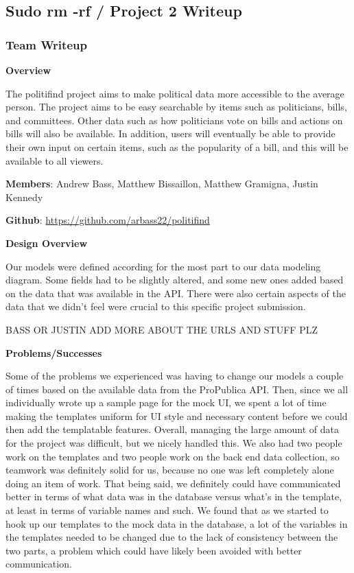 \documentclass{article}
\newcommand{\n}{\noindent}
\begin{document}
\begin{center}
\subsection*{Sudo rm -rf / Project 2 Writeup}
\end{center}

\subsubsection*{Team Writeup}

\textbf{Overview}

The politifind project aims to make political data more accessible to the average person. The project aims to be easy searchable by items such as politicians, bills, and committees. Other data such as how politicians vote on bills and actions on bills will also be available. In addition, users will eventually be able to provide their own input on certain items, such as the popularity of a bill, and this will be available to all viewers.

\n\textbf{Members}: Andrew Bass, Matthew Bissaillon, Matthew Gramigna, Justin Kennedy

\n\textbf{Github}: \url{https://github.com/arbass22/politifind}

\n\textbf{Design Overview}

Our models were defined according for the most part to our data modeling diagram. Some fields had to be slightly altered, and some new ones added based on the data that was available in the API. There were also certain aspects of the data that we didn't feel were crucial to this specific project submission.

BASS OR JUSTIN ADD MORE ABOUT THE URLS AND STUFF PLZ

\n\textbf{Problems/Successes}

Some of the problems we experienced was having to change our models a couple of times based on the available data from the ProPublica API. Then, since we all individually wrote up a sample page for the mock UI, we spent a lot of time making the templates uniform for UI style and necessary content before we could then add the templatable features. Overall, managing the large amount of data for the project was difficult, but we nicely handled this. We also had two people work on the templates and two people work on the back end data collection, so teamwork was definitely solid for us, because no one was left completely alone doing an item of work. That being said, we definitely could have communicated better in terms of what data was in the database versus what's in the template, at least in terms of variable names and such. We found that as we started to hook up our templates to the mock data in the database, a lot of the variables in the templates needed to be changed due to the lack of consistency between the two parts, a problem which could have likely been avoided with better communication.
\end{document}
